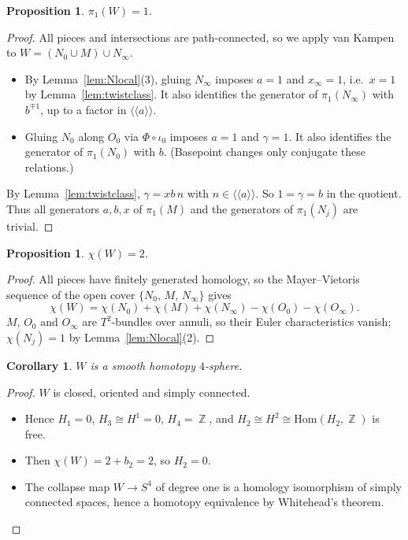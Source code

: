 \documentclass{article}
\DeclareMathOperator{\Z}{\mathbb{Z}}
\newtheorem{proposition}[theorem]{Proposition}
\newtheorem{corollary}[theorem]{Corollary}
\theoremstyle{definition}
\theoremstyle{plain}
\begin{document}
\begin{proposition}\label{prop:pi1W}
$\pi_1(W)=1$.
\end{proposition}
\begin{proof}
All pieces and intersections are path-connected, so we apply van Kampen to
$W=(N_0\cup M)\cup N_\infty$.
\begin{itemize}
\item By Lemma~\ref{lem:Nlocal}(3), gluing $N_\infty$ imposes $a=1$ and $x_\infty=1$,
  i.e.\ $x=1$ by Lemma~\ref{lem:twistclass}. It
  also identifies the generator of $\pi_1(N_\infty)$ with $b^{\mp1}$, up to a factor
  in $\langle\!\langle a\rangle\!\rangle$.
\item Gluing $N_0$ along $O_0$ via $\Phi\circ\iota_0$ imposes $a=1$ and $\gamma=1$. It
  also identifies the generator of $\pi_1(N_0)$ with $b$. (Basepoint changes only
  conjugate these relations.)
\end{itemize}
By Lemma~\ref{lem:twistclass}, $\gamma=xb\,n$ with $n\in\langle\!\langle a\rangle\!\rangle$. So
$1=\gamma=b$ in the quotient. Thus all generators $a,b,x$ of $\pi_1(M)$ and the generators
of $\pi_1(N_j)$ are trivial.
\end{proof}

\begin{proposition}\label{prop:chiW}
$\chi(W)=2$.
\end{proposition}
\begin{proof}
All pieces have finitely generated homology, so the Mayer--Vietoris sequence of
the open cover $\{N_0,\,M,\,N_\infty\}$ gives
\[\chi(W)=\chi(N_0)+\chi(M)+\chi(N_\infty)-\chi(O_0)-\chi(O_\infty).\]
$M$, $O_0$ and $O_\infty$ are $T^2$-bundles over annuli, so their Euler characteristics
vanish; $\chi(N_j)=1$ by Lemma~\ref{lem:Nlocal}(2).
\end{proof}

\begin{corollary}\label{cor:homotopysphere}
$W$ is a smooth homotopy $4$-sphere.
\end{corollary}
\begin{proof}
$W$ is closed, oriented and simply connected.
\begin{itemize}
\item Hence $H_1=0$, $H_3\cong H^1=0$, $H_4=\Z$, and $H_2\cong H^2\cong\mathrm{Hom}(H_2,\Z)$
  is free.
\item Then $\chi(W)=2+b_2=2$, so $H_2=0$.
\item The collapse map $W\to S^4$ of degree one is a homology isomorphism of simply
  connected spaces, hence a homotopy equivalence by Whitehead's theorem.
\end{itemize}
\end{proof}
\end{document}
